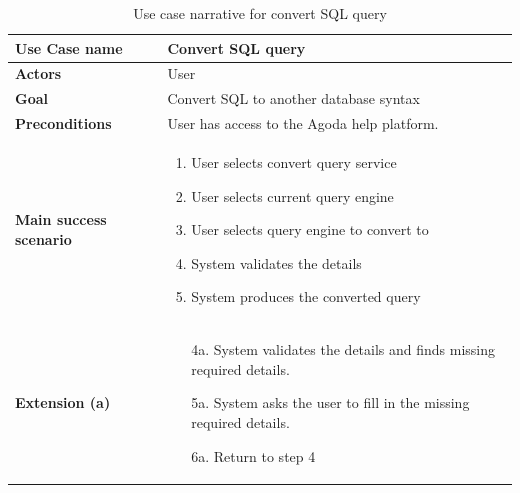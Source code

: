     \begin{table}[H]
        \centering
        \caption{Use case narrative for convert SQL query}
        \label{tbl:use-case-convert-sql}
        \begin{tabular}{|p{4cm}|p{10cm}|}
        \hline
        \textbf{Use Case name} & Convert SQL query \\ \hline
        \textbf{Actors} & User \\ \hline
        \textbf{Goal} & Convert SQL to another database syntax \\ \hline
        \textbf{Preconditions} & User has access to the Agoda help platform. \\ \hline
        \textbf{Main success scenario} &
        \begin{enumerate}
            \item User selects convert query service
            \item User selects current query engine
            \item User selects query engine to convert to
            \item System validates the details
            \item System produces the converted query
        \end{enumerate}
        \\ \hline
        \textbf{Extension (a)} &
        \begin{enumerate}
            \item[4a.] System validates the details and finds missing required details.
            \item[5a.] System asks the user to fill in the missing required details.
            \item[6a.] Return to step 4
        \end{enumerate}
        \\ \hline
        \end{tabular}
    \end{table}

